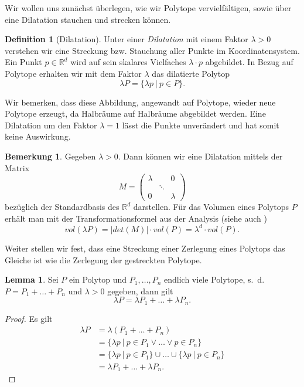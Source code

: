 \documentclass[11pt,titlepage]{article}
\newcommand{\setR}{\mathbb{R}}
\newcommand{\abs}[1]{{\left| #1 \right|}}
\theoremstyle{definition}
\newtheorem{lemma}[theorem]{Lemma}
\newtheorem{definition}[theorem]{Definition}
\newtheorem{remark}[theorem]{Bemerkung}
\theoremstyle{remark}
\begin{document}
	Wir wollen uns zunächst überlegen, wie wir Polytope vervielfältigen, sowie 
	über eine Dilatation stauchen und strecken können. 
	
	\begin{definition}[Dilatation]
		Unter einer \textsl{Dilatation} mit einem Faktor $\lambda>0$ 
		verstehen wir eine Streckung bzw. Stauchung aller Punkte 
		im Koordinatensystem. Ein Punkt $p\in\setR^d$ wird auf 
		sein skalares Vielfaches $\lambda\cdot p$ abgebildet. In Bezug auf 
		Polytope erhalten wir mit dem Faktor $\lambda$ das dilatierte Polytop 
		\[\lambda P=\{\lambda p\ \vert\ p\in P\}.\]
	\end{definition}
	
	Wir bemerken, dass diese Abbildung, angewandt auf Polytope, wieder neue 
	Polytope erzeugt, da Halbräume auf Halbräume abgebildet werden. 
	Eine Dilatation um den Faktor $\lambda=1$ lässt die Punkte unverändert und 
	hat somit keine Auswirkung. 
	
	\begin{remark}\label{bem:dilvol}
		Gegeben $\lambda >0$. Dann können wir eine Dilatation mittels der Matrix
		\[M=\begin{pmatrix}
		\lambda &\ & 0\\
		\ &\ddots &\ \\
		0 &\ &\lambda
		\end{pmatrix}\] 
		bezüglich der Standardbasis des $\setR^d$ darstellen. Für das Volumen 
		eines Polytops $P$ erhält man mit 
		der Transformationsformel aus der Analysis (siehe auch \cite[Satz 4.7]{SkriptAna3})
		\[vol(\lambda P)=\abs{det(M)}\cdot vol(P)=\lambda^d\cdot vol(P).\]
	\end{remark}
	
	Weiter stellen wir fest, dass eine Streckung einer Zerlegung eines 
	Polytops das Gleiche ist wie die Zerlegung der gestreckten Polytope.
	
	\begin{lemma} \label{lemma:dilzerl}
		Sei $P$ ein Polytop und $P_1,\ldots,P_n$ endlich viele Polytope, s.~d. 
		$P=P_1+\ldots+P_n$ und $\lambda>0$ gegeben, dann gilt 
		\[\lambda P=\lambda P_1+\ldots+\lambda P_n.\]
	\end{lemma}
	
	\begin{proof}
		Es gilt
		\begin{align*}
			\lambda P&=\lambda(P_1+\ldots+P_n)\\
			&=\{\lambda p\ \vert\ p\in P_1 	\lor\ldots\lor p\in P_n\}\\
			&=\{\lambda p\ \vert\ p\in P_1\}\cup\ldots\cup
			\{\lambda p\ \vert\ p\in P_n\}\\
			&=\lambda P_1 +\ldots+\lambda P_n.
		\end{align*}
	\end{proof}
	
\end{document}
